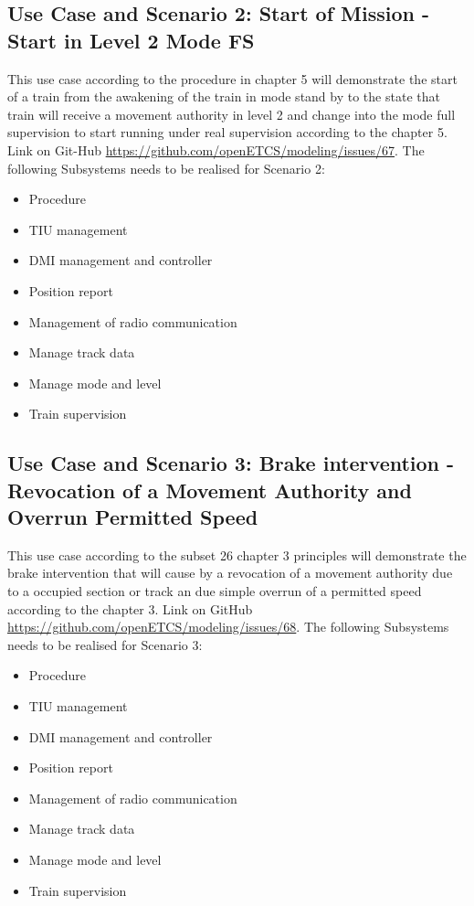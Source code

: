 \subsection{Use Case and Scenario 2: Start of Mission - Start in Level 2 Mode FS}
This use case according to the procedure in chapter 5 will demonstrate the start of a train from the awakening of the train in mode stand by to the state that train will receive a movement authority in level 2 and change into the mode full supervision to start running under real supervision according to the chapter 5. Link on Git-Hub \url{https://github.com/openETCS/modeling/issues/67}. The following Subsystems needs to be realised for Scenario 2:
\begin{itemize}
\item Procedure
\item TIU management
\item DMI management and controller
\item Position report
\item Management of radio communication
\item Manage track data
\item Manage mode and level
\item Train supervision
\end{itemize}

\subsection{Use Case and Scenario 3: Brake intervention - Revocation of a Movement Authority and Overrun Permitted Speed}
This use case according to the subset 26 chapter 3 principles will demonstrate the brake intervention that will cause by a revocation of a movement authority due to a occupied section or track an due simple overrun of a permitted speed  according to the chapter 3. Link on GitHub \url{https://github.com/openETCS/modeling/issues/68}. The following Subsystems needs to be realised for Scenario 3:
\begin{itemize}
\item Procedure
\item TIU management
\item DMI management and controller
\item Position report
\item Management of radio communication
\item Manage track data
\item Manage mode and level
\item Train supervision
\end{itemize}


